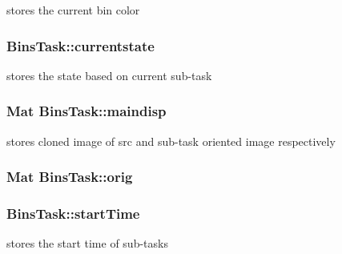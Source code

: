 stores the current bin color 

\subsubsection[{\texorpdfstring{currentstate}{currentstate}}]{ Bins\+Task\+::currentstate}\hypertarget{classBinsTask_a582b4e240c7018b7119f20c66860a6cf}{}\label{classBinsTask_a582b4e240c7018b7119f20c66860a6cf}


stores the state based on current sub-\/task 

\subsubsection[{\texorpdfstring{maindisp}{maindisp}}]{\setlength{\rightskip}{0pt plus 5cm}Mat Bins\+Task\+::maindisp}\hypertarget{classBinsTask_ab446e684e463435b9e2a3b5fa9a046a3}{}\label{classBinsTask_ab446e684e463435b9e2a3b5fa9a046a3}


stores cloned image of src and sub-\/task oriented image respectively 

\subsubsection[{\texorpdfstring{orig}{orig}}]{\setlength{\rightskip}{0pt plus 5cm}Mat Bins\+Task\+::orig}\hypertarget{classBinsTask_aedf5f6032dcea5fbab09caed34cf80ac}{}\label{classBinsTask_aedf5f6032dcea5fbab09caed34cf80ac}
\subsubsection[{\texorpdfstring{start\+Time}{startTime}}]{ Bins\+Task\+::start\+Time}\hypertarget{classBinsTask_a0f9b188187c02eaf4081c896bed1a1d8}{}\label{classBinsTask_a0f9b188187c02eaf4081c896bed1a1d8}


stores the start time of sub-\/tasks 


